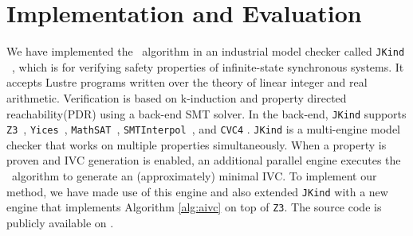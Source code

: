 \section{Implementation and Evaluation}
\label{sec:impl}

We have implemented the \aivcalg ~algorithm 
in an industrial model checker called \texttt{JKind} ~\cite{jkind}, 
which is for verifying safety properties of  infinite-state synchronous systems. 
It accepts Lustre programs \cite{Halbwachs91:lustre}
written over the theory of linear integer and real arithmetic. 
Verification is based on k-induction and property directed reachability(PDR) using a back-end SMT solver.
In the
back-end, \texttt{JKind} supports \texttt{Z3}~\cite{DeMoura08:z3},
\texttt{Yices}~\cite{Dutertre06:yices}, \texttt{MathSAT}~\cite{Cimatti2013:MathSAT},
\texttt{SMTInterpol}~\cite{Christ2012:SMTInterpol}, and \texttt{CVC4} \cite{barrett2011cvc4}. \texttt{JKind} is a multi-engine model checker that works on multiple properties simultaneously. When a property is
proven and IVC generation is enabled, an additional parallel engine
executes the \ucalg ~algorithm \cite{Ghass16} to generate an (approximately) minimal IVC. To implement our method, we have made use of this engine and also extended \texttt{JKind} with a new engine that
implements Algorithm \ref{alg:aivc} on top of \texttt{Z3}.
The source code is publicly available on \cite{mygit}.



%
 
 